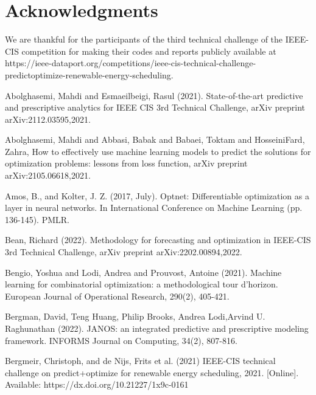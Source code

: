 \documentclass[conference]{IEEEtran}
\begin{document}
\section*{Acknowledgments}
We are thankful for the participants of the third technical challenge of the IEEE-CIS competition for making their codes and reports publicly available at https://ieee-dataport.org/competitions/ieee-cis-technical-challenge-predictoptimize-renewable-energy-scheduling. 
\begin{thebibliography}{00}

 Abolghasemi, Mahdi and Esmaeilbeigi, Rasul (2021). State-of-the-art predictive and prescriptive analytics for IEEE CIS 3rd Technical Challenge, arXiv preprint arXiv:2112.03595,2021.

 Abolghasemi, Mahdi and Abbasi, Babak and Babaei, Toktam and HosseiniFard, Zahra, 
How to effectively use machine learning models to predict the solutions for optimization problems: lessons from loss function,
 arXiv preprint arXiv:2105.06618,2021.
 
 Amos, B., and Kolter, J. Z. (2017, July). Optnet: Differentiable optimization as a layer in neural networks. In International Conference on Machine Learning (pp. 136-145). PMLR.

 Bean, Richard (2022).
 Methodology for forecasting and optimization in IEEE-CIS 3rd Technical Challenge, arXiv preprint arXiv:2202.00894,2022. 

 Bengio, Yoshua and Lodi, Andrea and Prouvost, Antoine (2021). Machine learning for combinatorial optimization: a methodological tour d’horizon. European Journal of Operational Research, 290(2), 405-421.

 Bergman, David, Teng Huang, Philip Brooks, Andrea Lodi,Arvind U. Raghunathan (2022). JANOS: an integrated predictive and prescriptive modeling framework. INFORMS Journal on Computing, 34(2), 807-816.


 Bergmeir, Christoph, and de Nijs, Frits et al. (2021) IEEE-CIS technical challenge on predict+optimize for renewable energy scheduling, 2021. [Online]. Available: https://dx.doi.org/10.21227/1x9c-0161


\end{thebibliography}
\end{document}
